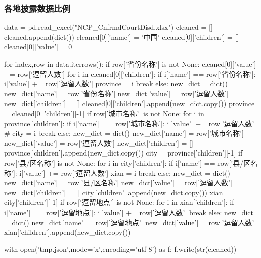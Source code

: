 \documentclass{ctexart}
\begin{document}
\subsubsection{各地披露数据比例}
\begin{python}
data = pd.read_excel("NCP_CnfrmdCourtDisd.xlsx")
cleaned = []
cleaned.append(dict())
cleaned[0]['name'] = '中国'
cleaned[0]['children'] = []
cleaned[0]['value'] = 0

for index,row in data.iterrows():
    if row['省份名称'] is not None:
        cleaned[0]['value'] += row['逗留人数']
        for i in cleaned[0]['children']:
            if i['name'] == row['省份名称']:
                i['value'] += row['逗留人数']
                province = i
                break
        else:
            new_dict = dict()
            new_dict['name'] = row['省份名称']
            new_dict['value'] = row['逗留人数']
            new_dict['children'] = []
            cleaned[0]['children'].append(new_dict.copy())
            province = cleaned[0]['children'][-1]
    if row['城市名称'] is not None:
        for i in province['children']:
            if i['name'] == row['城市名称']:
                i['value'] += row['逗留人数']
                # city = i
                break
        else:
            new_dict = dict()
            new_dict['name'] = row['城市名称']
            new_dict['value'] = row['逗留人数']
            new_dict['children'] = []
            province['children'].append(new_dict.copy())
            city = province['children'][-1]
    if row['县/区名称'] is not None:
        for i in city['children']:
            if i['name'] == row['县/区名称']:
                i['value'] += row['逗留人数']
                xian = i
                break
        else:
            new_dict = dict()
            new_dict['name'] = row['县/区名称']
            new_dict['value'] = row['逗留人数']
            new_dict['children'] = []
            city['children'].append(new_dict.copy())
            xian = city['children'][-1]
    if row['逗留地点'] is not None:
        for i in xian['children']:
            if i['name'] == row['逗留地点']:
                i['value'] += row['逗留人数']
                break
        else:
            new_dict = dict()
            new_dict['name'] = row['逗留地点']
            new_dict['value'] = row['逗留人数']
            xian['children'].append(new_dict.copy())

with open('tmp.json',mode='x',encoding='utf-8') as f:
    f.write(str(cleaned))
\end{python}
\end{document}
